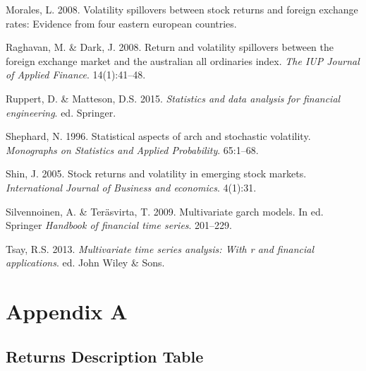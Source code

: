 \documentclass[11pt,preprint, authoryear]{elsarticle}
\numberwithin{equation}{section}
\numberwithin{figure}{section}
\numberwithin{table}{section}
\begin{document}
\leavevmode\hypertarget{ref-morales2008}{}%
Morales, L. 2008. Volatility spillovers between stock returns and
foreign exchange rates: Evidence from four eastern european countries.

\leavevmode\hypertarget{ref-raghavan2008}{}%
Raghavan, M. \& Dark, J. 2008. Return and volatility spillovers between
the foreign exchange market and the australian all ordinaries index.
\emph{The IUP Journal of Applied Finance}. 14(1):41--48.

\leavevmode\hypertarget{ref-ruppert2015}{}%
Ruppert, D. \& Matteson, D.S. 2015. \emph{Statistics and data analysis
for financial engineering}. ed. Springer.

\leavevmode\hypertarget{ref-shephard1996}{}%
Shephard, N. 1996. Statistical aspects of arch and stochastic
volatility. \emph{Monographs on Statistics and Applied Probability}.
65:1--68.

\leavevmode\hypertarget{ref-shin2005}{}%
Shin, J. 2005. Stock returns and volatility in emerging stock markets.
\emph{International Journal of Business and economics}. 4(1):31.

\leavevmode\hypertarget{ref-silvennoinen2009}{}%
Silvennoinen, A. \& Teräsvirta, T. 2009. Multivariate garch models. In
ed. Springer \emph{Handbook of financial time series}. 201--229.

\leavevmode\hypertarget{ref-tsay2013}{}%
Tsay, R.S. 2013. \emph{Multivariate time series analysis: With r and
financial applications}. ed. John Wiley \& Sons.

\newpage

\hypertarget{appendix-a}{%
\section*{Appendix A}\label{appendix-a}}

\hypertarget{returns-description-table}{%
\subsection{Returns Description Table}\label{returns-description-table}}
\end{document}
